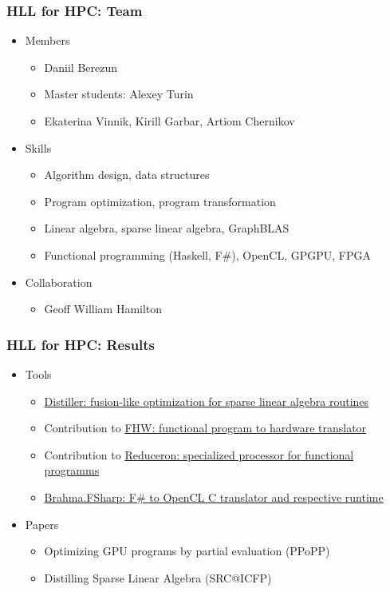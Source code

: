 \documentclass[xcolor=table,aspectratio=169]{beamer}
\begin{document}
\begin{frame}[fragile]
  \frametitle{HLL for HPC: Team}
  \begin{itemize}
    \item Members 
    \begin{itemize}
      \item Daniil Berezun
      \item Master students: Alexey Turin
      \item Ekaterina Vinnik, Kirill Garbar, Artiom Chernikov
    \end{itemize} 
    \item Skills 
    \begin{itemize}
      \item Algorithm design, data structures
      \item Program optimization, program transformation
      \item Linear algebra, sparse linear algebra, GraphBLAS
      \item Functional programming (Haskell, F\#), OpenCL, GPGPU, FPGA 
    \end{itemize}
    \item Collaboration
    \begin{itemize}
      \item Geoff William Hamilton
    \end{itemize}
  \end{itemize}
\end{frame}

\begin{frame}[fragile]
  \frametitle{HLL for HPC: Results}
    \begin{itemize}
      \item Tools
      \begin{itemize}
        \item \href{https://github.com/YaccConstructor/Distiller}{Distiller: fusion-like optimization for sparse linear algebra routines}
        \item Contribution to \href{https://github.com/sedwards-lab/fhw}{FHW: functional program to hardware translator}    
        \item Contribution to \href{https://github.com/tommythorn/Reduceron}{Reduceron: specialized processor for functional programms}    
        \item \href{https://github.com/YaccConstructor/Brahma.FSharp}{Brahma.FSharp: F\# to OpenCL C translator and respective runtime}
      \end{itemize}
      \item Papers 
      \begin{itemize}
        \item Optimizing GPU programs by partial evaluation (PPoPP)
        \item Distilling Sparse Linear Algebra (SRC@ICFP)
      \end{itemize} 
    \end{itemize}
\end{frame}
\end{document}
